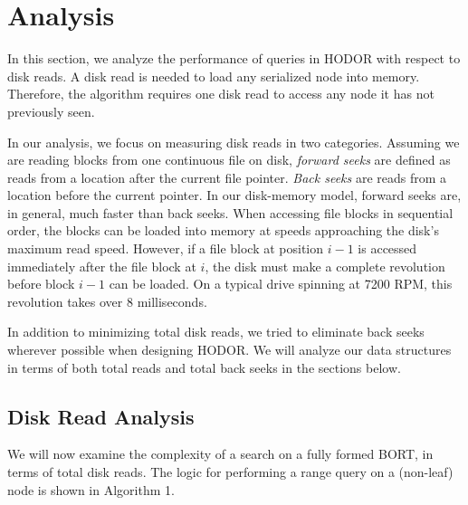 \documentclass[11pt, oneside]{article}
\begin{document}
\section{Analysis}

In this section, we analyze the performance of queries in HODOR with respect to
disk reads. A disk read is needed to load any serialized node into memory.
Therefore, the algorithm requires one disk read to access any node it has not
previously seen.

In our analysis, we focus on measuring disk reads in two categories.  Assuming
we are reading blocks from one continuous file on disk, \textit{forward seeks}
are defined as reads from a location after the current file pointer.
\textit{Back seeks} are reads from a location before the current pointer. In our
disk-memory model, forward seeks are, in general, much faster than back seeks.
When accessing file blocks in sequential order, the blocks can be loaded into
memory at speeds approaching the disk's maximum read speed.  However, if a file
block at position $i-1$ is accessed immediately after the file block at $i$, the
disk must make a complete revolution before block $i-1$ can be loaded. On a
typical drive spinning at 7200 RPM, this revolution takes over 8 milliseconds.

In addition to minimizing total disk reads, we tried to eliminate back seeks
wherever possible when designing HODOR. We will analyze our data structures in
terms of both total reads and total back seeks in the sections below.

\subsection{Disk Read Analysis}

We will now examine the complexity of a search on a fully formed BORT, in terms
of total disk reads. The logic for performing a range query on a (non-leaf) node
is shown in Algorithm 1.
\end{document}
